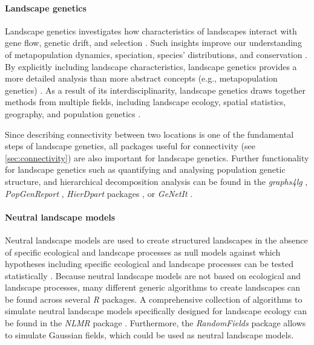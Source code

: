 \documentclass[smallextended]{svjour3}       %
\begin{document}
\hypertarget{sec:landscape_genetics}{%
\paragraph{Landscape genetics}\label{sec:landscape_genetics}}

Landscape genetics investigates how characteristics of landscapes interact with gene flow, genetic drift, and selection \cite{Manel2003}.
Such insights improve our understanding of metapopulation dynamics, speciation, species' distributions, and conservation \cite{Storfer2007}.
By explicitly including landscape characteristics, landscape genetics provides a more detailed analysis than more abstract concepts (e.g., metapopulation genetics) \cite{Holderegger2006}.
As a result of its interdisciplinarity, landscape genetics draws together methods from multiple fields, including landscape ecology, spatial statistics, geography, and population genetics \cite{Storfer2007}.

Since describing connectivity between two locations is one of the fundamental steps of landscape genetics, all packages useful for connectivity (see \ref{sec:connectivity}) are also important for landscape genetics.
Further functionality for landscape genetics such as quantifying and analysing population genetic structure, and hierarchical decomposition analysis can be found in the \textit{graphs4lg} \cite{Savary2020}, \textit{PopGenReport} \cite{Adamack2014,Gruber2015}, \textit{HierDpart} packages \cite{Qin2019}, or \textit{GeNetIt} \cite{Murphy2010}.

\hypertarget{sec:NLM}{%
\paragraph{Neutral landscape models}\label{sec:NLM}}

Neutral landscape models are used to create structured landscapes in the absence of specific ecological and landscape processes as null models against which hypotheses including specific ecological and landscape processes can be tested statistically \cite{Gardner1987,With1997}.
Because neutral landscape models are not based on ecological and landscape processes, many different generic algorithms to create landscapes can be found across several \textit{R} packages.
A comprehensive collection of algorithms to simulate neutral landscape models specifically designed for landscape ecology can be found in the \textit{NLMR} package \cite{Sciaini2018}.
Furthermore, the \textit{RandomFields} package \cite{Schlather2015} allows to simulate Gaussian fields, which could be used as neutral landscape models.
\end{document}
